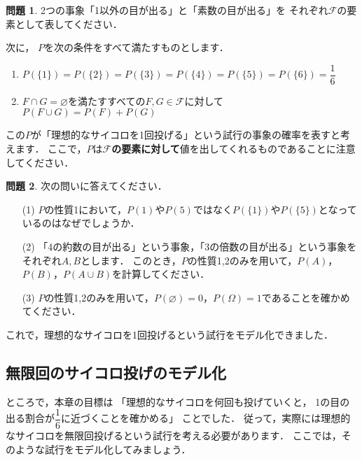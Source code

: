 \documentclass[./main]{subfiles} %
\theoremstyle{definition}
\newtheorem{hamadadefi}{定義}[Section]
\newtheorem{hamadaqst}[hamadadefi]{問題}
\begin{document}
\begin{hamadaqst}\label{checkofF}
2つの事象「1以外の目が出る」と「素数の目が出る」を
それぞれ$\mathcal{F}$の要素として表してください．
\end{hamadaqst}

次に，
$P$を次の条件をすべて満たすものとします．
\begin{enumerate}
\item $P(\{1\})=P(\{2\})=P(\{3\})=P(\{4\})=P(\{5\})=P(\{6\})=\dfrac{1}{6}$
\item $F\cap G=\varnothing$を満たすすべての$F,G\in\mathcal{F}$に対して
$P(F\cup G)=P(F)+P(G)$
\end{enumerate}
この$P$が「理想的なサイコロを1回投げる」という試行の事象の確率を表すと考えます．
ここで，$P$は\textbf{$\mathcal{F}$の要素に対して}値を出してくれるものであることに注意してください．

\begin{hamadaqst}\label{checkofP}
次の問いに答えてください．
\begin{itemize}
\item[(1)]$P$の性質1において，$P(1)$や$P(5)$ではなく$P(\{1\})$や$P(\{5\})$となっているのはなぜでしょうか．
\item[(2)]「4の約数の目が出る」という事象，「3の倍数の目が出る」という事象をそれぞれ$A,B$とします．
このとき，$P$の性質1,2のみを用いて，$P(A)$，$P(B)$，$P(A\cup B)$を計算してください．
\item[(3)]$P$の性質1,2のみを用いて，$P(\varnothing)=0$，$P(\Omega)=1$であることを確かめてください．
\end{itemize}
\end{hamadaqst}

これで，理想的なサイコロを1回投げるという試行をモデル化できました．


\subsection{無限回のサイコロ投げのモデル化}\label{subsec:infiniteprobsp}

ところで，本章の目標は
「理想的なサイコロを何回も投げていくと，
1の目の出る割合が$\dfrac{1}{6}$に近づくことを確かめる」
ことでした．
従って，実際には理想的なサイコロを無限回投げるという試行を考える必要があります．
ここでは，そのような試行をモデル化してみましょう．
\end{document}
